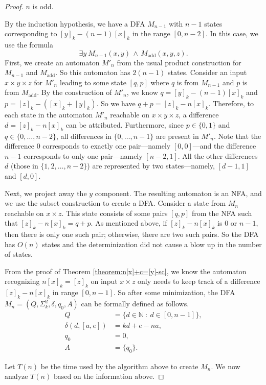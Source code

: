 \documentclass[12pt,reqno]{article}
\def\AND{\, \wedge \,}
\def\suchthat{\ : \ }
\def\add{\text{add}}
\begin{document}
\begin{proof}
\bigskip{} $n$ is odd.

By the induction hypothesis, we have a DFA $M_{n-1}$ with $n-1$ states corresponding to $[y]_k - (n-1)[x]_k$ in the range $[0, n-2]$.
In this case, we use the formula
$$ \exists y \ M_{n-1}(x,y) \AND M_{\add}(x, y, z).$$
First, we create an automaton $M'_{n}$ from the usual product construction for $M_{n-1}$ and $M_{\add}$. So this automaton has $2(n-1) $ states. Consider an input $x \times y \times z$ for $M'_{n}$ leading to some state $[q, p]$ where $q$ is from $M_{n-1}$ and $p$ is from $M_{\add}$. By the construction of $M'_{n}$, we know $q=[y]_k - (n-1)[x]_k$ and $p=[z]_k - ([x]_k + [y]_k)$. So we have $q+p = [z]_k - n[x]_k$. Therefore, to each state in the automaton $M'_{n}$ reachable on $x \times y \times z$, a difference $d=[z]_k - n[x]_k$ can be attributed. Furthermore, since $p \in \{0, 1\}$ and $q \in \{0, \ldots, n-2\}$, all differences in $\{0, \ldots, n-1\}$ are present in $M'_{n}$. Note that the difference $0$ corresponds to exactly one pair---namely $[0,0]$---and the difference $n-1$ corresponds to only one pair---namely $[n-2,1]$.
All the other differences $d$ (those in $\{ 1,2,\ldots, n-2\}$)  are represented by two states---namely, $[d-1,1]$ and $[d,0]$.

Next, we project away the $y$ component.  The resulting automaton is an NFA, and we use the subset construction to create a DFA.  Consider a state from $M_{n}$ reachable on $x \times z$. This state consists of some pairs $[q, p]$ from the NFA such that $[z]_k - n[x]_k = q+p$. As mentioned above, if $[z]_k-n[x]_k$ is $0$ or $n-1$, then there is only one such pair; otherwise, there are two such pairs.
 So the DFA has $O(n)$ states and the determinization did not cause a blow up in the number of states.

From the proof of Theorem \ref{theorem:n[x]+c=[y]-sc}, we know the automaton recognizing $n[x]_k= [z]_k$ on input $x \times z$ only needs to keep track of a difference $[z]_k - n[x]_k$ in range $[0, n-1]$. So after some minimization, the DFA  $M_{n}=(Q, \Sigma^2_k, \delta, q_0, A)$ can be formally defined as follows.
\begin{align*}
Q &= \{ d \in \mathbb{N}  \suchthat d \in [0, n-1] \}, \\
\delta(d, [a, e]) &= kd + e - na,
 \\
q_0 &= 0, \\
A &= \{q_0\}.
\end{align*}

Let $T(n)$ be the time used by the algorithm above to create $M_n$. We now analyze $T(n)$ based on the information above.


\end{proof}
\end{document}
